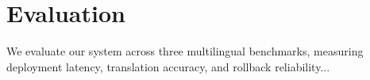 \section{Evaluation}
We evaluate our system across three multilingual benchmarks, measuring deployment latency, translation accuracy, and rollback reliability...